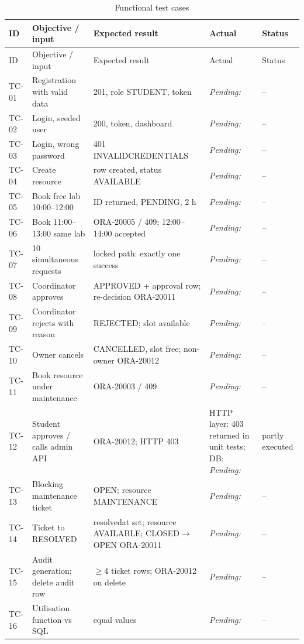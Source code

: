 \documentclass[12pt,a4paper,oneside]{report}
\newcommand{\pending}[1]{\textcolor{black!55}{\textit{Pending: #1}}}
\renewcommand{\_}{\origus\allowbreak}
\begin{document}
\begin{small}
\setlength{\tabcolsep}{4pt}
\begin{longtable}{@{}p{1.1cm}p{3.6cm}p{4.6cm}p{3.2cm}p{1.6cm}@{}}
\caption{Functional test cases}\label{tab:tests}\\\toprule
ID & Objective / input & Expected result & Actual & Status\\\midrule\endfirsthead
\toprule ID & Objective / input & Expected result & Actual & Status\\\midrule\endhead
TC-01 & Registration with valid data & 201, role STUDENT, token & \pending{} & --\\
TC-02 & Login, seeded user & 200, token, dashboard & \pending{} & --\\
TC-03 & Login, wrong password & 401 INVALID\_CREDENTIALS & \pending{} & --\\
TC-04 & Create resource & row created, status AVAILABLE & \pending{} & --\\
TC-05 & Book free lab 10:00--12:00 & ID returned, PENDING, 2 h & \pending{} & --\\
TC-06 & Book 11:00--13:00 same lab & ORA-20005 / 409; 12:00--14:00 accepted & \pending{} & --\\
TC-07 & 10 simultaneous requests & locked path: exactly one success & \pending{} & --\\
TC-08 & Coordinator approves & APPROVED + approval row; re-decision ORA-20011 & \pending{} & --\\
TC-09 & Coordinator rejects with reason & REJECTED; slot available & \pending{} & --\\
TC-10 & Owner cancels & CANCELLED, slot free; non-owner ORA-20012 & \pending{} & --\\
TC-11 & Book resource under maintenance & ORA-20003 / 409 & \pending{} & --\\
TC-12 & Student approves / calls admin API & ORA-20012; HTTP 403 & HTTP layer: 403 returned in unit tests; DB: \pending{} & partly executed\\
TC-13 & Blocking maintenance ticket & OPEN; resource MAINTENANCE & \pending{} & --\\
TC-14 & Ticket to RESOLVED & resolved\_at set; resource AVAILABLE; CLOSED$\to$OPEN ORA-20011 & \pending{} & --\\
TC-15 & Audit generation; delete audit row & $\ge$4 ticket rows; ORA-20012 on delete & \pending{} & --\\
TC-16 & Utilisation function vs SQL & equal values & \pending{} & --\\

\end{longtable}
\end{small}
\end{document}
